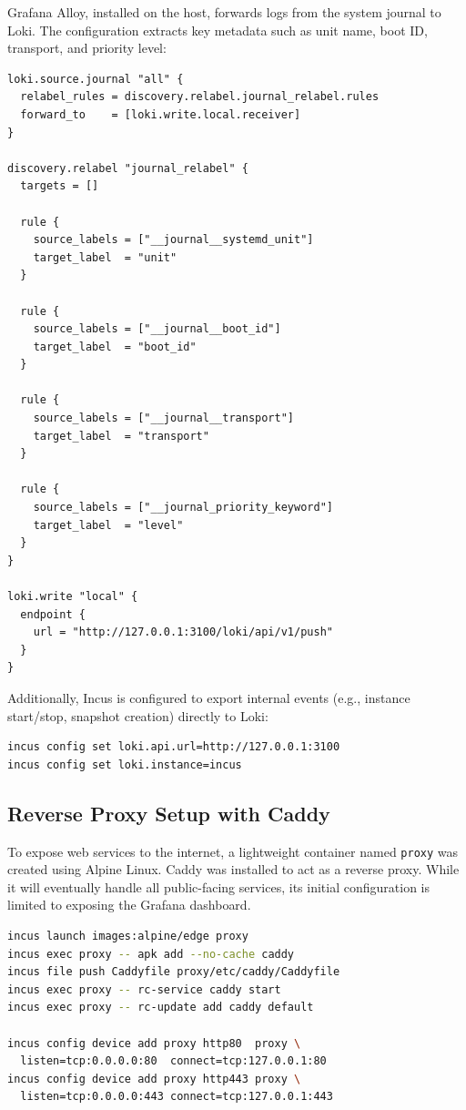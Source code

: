 Grafana Alloy, installed on the host\cite{grafana-alloy-install}, forwards logs from the system journal to Loki. The configuration\cite{grafana-alloy-config-example} extracts key metadata such as unit name, boot ID, transport, and priority level:

\begin{lstlisting}[caption={Grafana Alloy configuration for forwarding journal logs to Loki.}]
loki.source.journal "all" {
  relabel_rules = discovery.relabel.journal_relabel.rules
  forward_to    = [loki.write.local.receiver]
}

discovery.relabel "journal_relabel" {
  targets = []

  rule {
    source_labels = ["__journal__systemd_unit"]
    target_label  = "unit"
  }

  rule {
    source_labels = ["__journal__boot_id"]
    target_label  = "boot_id"
  }

  rule {
    source_labels = ["__journal__transport"]
    target_label  = "transport"
  }

  rule {
    source_labels = ["__journal_priority_keyword"]
    target_label  = "level"
  }
}

loki.write "local" {
  endpoint {
    url = "http://127.0.0.1:3100/loki/api/v1/push"
  }
}
\end{lstlisting}

Additionally, Incus is configured to export internal events (e.g., instance start/stop, snapshot creation) directly to Loki\cite{incus-loki-api}:

\begin{lstlisting}[language=bash]
incus config set loki.api.url=http://127.0.0.1:3100
incus config set loki.instance=incus
\end{lstlisting}

\subsection*{Reverse Proxy Setup with Caddy}

To expose web services to the internet, a lightweight container named \texttt{proxy} was created using Alpine Linux. Caddy was installed to act as a reverse proxy. While it will eventually handle all public-facing services, its initial configuration is limited to exposing the Grafana dashboard.

\begin{lstlisting}[language=bash,caption={Commands to set up the Caddy reverse proxy container.}]
incus launch images:alpine/edge proxy
incus exec proxy -- apk add --no-cache caddy
incus file push Caddyfile proxy/etc/caddy/Caddyfile
incus exec proxy -- rc-service caddy start
incus exec proxy -- rc-update add caddy default

incus config device add proxy http80  proxy \
  listen=tcp:0.0.0.0:80  connect=tcp:127.0.0.1:80
incus config device add proxy http443 proxy \
  listen=tcp:0.0.0.0:443 connect=tcp:127.0.0.1:443
\end{lstlisting}

